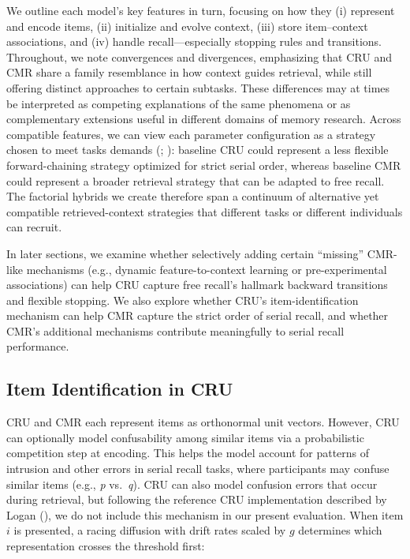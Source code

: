 \documentclass[
  man,
  floatsintext,
  longtable,
  nolmodern,
  notxfonts,
  notimes,
  draftfirst,
  colorlinks=true,linkcolor=blue,citecolor=blue,urlcolor=blue]{apa7}
\begin{document}
We outline each model's key features in turn, focusing on how they (i)
represent and encode items, (ii) initialize and evolve context, (iii)
store item--context associations, and (iv) handle recall---especially
stopping rules and transitions. Throughout, we note convergences and
divergences, emphasizing that CRU and CMR share a family resemblance in
how context guides retrieval, while still offering distinct approaches
to certain subtasks. These differences may at times be interpreted as
competing explanations of the same phenomena or as complementary
extensions useful in different domains of memory research. Across
compatible features, we can view each parameter configuration as a
strategy chosen to meet tasks demands
(;
): baseline CRU could
represent a less flexible forward-chaining strategy optimized for strict
serial order, whereas baseline CMR could represent a broader retrieval
strategy that can be adapted to free recall. The factorial hybrids we
create therefore span a continuum of alternative yet compatible
retrieved-context strategies that different tasks or different
individuals can recruit.

In later sections, we examine whether selectively adding certain
``missing'' CMR-like mechanisms (e.g., dynamic feature-to-context
learning or pre-experimental associations) can help CRU capture free
recall's hallmark backward transitions and flexible stopping. We also
explore whether CRU's item-identification mechanism can help CMR capture
the strict order of serial recall, and whether CMR's additional
mechanisms contribute meaningfully to serial recall performance.

\subsection{Item Identification in
CRU}\label{item-identification-in-cru}

CRU and CMR each represent items as orthonormal unit vectors. However,
CRU can optionally model confusability among similar items via a
probabilistic competition step at encoding. This helps the model account
for patterns of intrusion and other errors in serial recall tasks, where
participants may confuse similar items (e.g., \emph{p} vs.~\emph{q}).
CRU can also model confusion errors that occur during retrieval, but
following the reference CRU implementation described by Logan
(), we do not include this mechanism
in our present evaluation. When item \(i\) is presented, a racing
diffusion with drift rates scaled by \(g\) determines which
representation crosses the threshold first:
\end{document}
